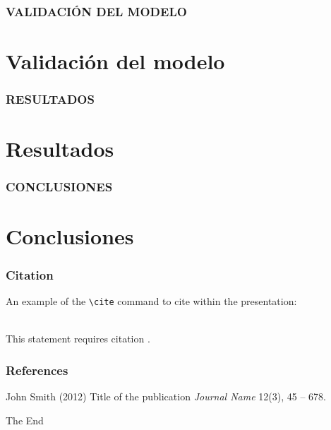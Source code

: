 \documentclass{beamer}
\begin{document}
\begin{frame}
\frametitle{VALIDACIÓN DEL MODELO}
\section{Validación del modelo}

\end{frame}

\begin{frame}
\frametitle{RESULTADOS}
\section{Resultados}

\end{frame}

\begin{frame}
\frametitle{CONCLUSIONES}
\section{Conclusiones}

\end{frame}



\begin{frame}[fragile] %
\frametitle{Citation}
An example of the \verb|\cite| command to cite within the presentation:\\~

This statement requires citation \cite{p1}.
\end{frame}


\begin{frame}
\frametitle{References}
\footnotesize{
\begin{thebibliography}{99} %
 John Smith (2012)
\newblock Title of the publication
\newblock \emph{Journal Name} 12(3), 45 -- 678.
\end{thebibliography}
}
\end{frame}


\begin{frame}
\Huge{\centerline{The End}}
\end{frame}

\end{document}
